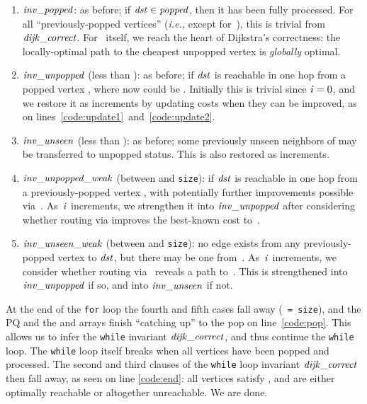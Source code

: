 \begin{enumerate}
\item $\mathit{inv\_popped}$: as before; if $\mathit{dst} \in \mathit{popped}$, then it has been fully processed.
For all ``previously-popped vertices'' (\emph{i.e., }except for~),
this is trivial from $\mathit{dijk\_correct}$. For~ itself, we reach the heart of Dijkstra's correctness:
the locally-optimal path to the cheapest unpopped vertex is
\emph{globally} optimal.
\item $\mathit{inv\_unpopped}$ (less than ): as before; if $\mathit{dst}$ is reachable in
one hop from a popped vertex , where now  could be . Initially this is trivial since $\mathit{i}=0$, and we restore it as  increments by updating costs when they can be improved, as on lines~\ref{code:update1}~and~\ref{code:update2}.
\item $\mathit{inv\_unseen}$ (less than ): as before; some previously unseen neighbors of  may be transferred to unpopped status.  This is also restored as  increments.
\item $\mathit{inv\_unpopped\_weak}$ (between  and \texttt{size}):
if $\mathit{dst}$ is reachable in one hop from a previously-popped vertex ,
with potentially further improvements possible via~.
As~$\mathit{i}$ increments, we strengthen it
into $\mathit{inv\_unpopped}$ after considering whether routing via
 improves the best-known cost to~.
\item $\mathit{inv\_unseen\_weak}$ (between  and \texttt{size}):
no edge exists from any previously-popped vertex to
$\mathit{dst}$, but there may be one from~.
As~$\mathit{i}$ increments, we consider whether routing via~
reveals a path to~.
This is strengthened into
$\mathit{inv\_unpopped}$ if so, and into
$\mathit{inv\_unseen}$ if not.
\end{enumerate}
\vspace*{-0.25em}
At the end of the \texttt{for} loop
the fourth and fifth cases fall away
(\texttt{~=~size}), and the PQ and the  and  arrays
finish ``catching up'' to the pop on line~\ref{code:pop}.
This allows us to infer
the \texttt{while} invariant $\mathit{dijk\_correct}$,
and thus continue the \texttt{while} loop.
The \texttt{while} loop itself breaks when all vertices have been popped
and processed. The second and third clauses of the \texttt{while} loop invariant
$\mathit{dijk\_correct}$ then fall away, as seen on line \ref{code:end}:
all vertices satisfy , and are either optimally reachable or altogether unreachable.
We are done.

